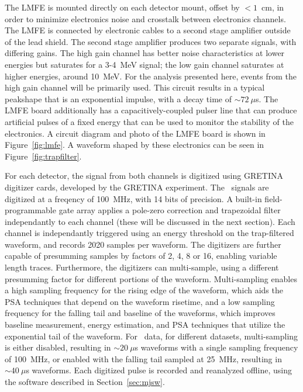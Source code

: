 \documentclass[/main.tex]{subfiles}
\begin{document}
The LMFE is mounted directly on each detector mount, offset by $<1$~cm, in order to minimize electronics noise and crosstalk between electronics channels.
The LMFE is connected by electronic cables to a second stage amplifier outside of the lead shield.
The second stage amplifier produces two separate signals, with differing gains. The high gain channel has better noise characteristics at lower energies but saturates for a 3-4~MeV signal; the low gain channel saturates at higher energies, around 10~MeV.
For the analysis presented here, events from the high gain channel will be primarily used.
This circuit results in a typical peakshape that is an exponential impulse, with a decay time of ${\sim}72~\mu$s.
The LMFE board additionally has a capacitively-coupled pulser line that can produce artificial pulses of a fixed energy that can be used to monitor the stability of the electronics.
A circuit diagram and photo of the LMFE board is shown in Figure~\ref{fig:lmfe}.
A waveform shaped by these electronics can be seen in Figure~\ref{fig:trapfilter}.

For each detector, the signal from both channels is digitized using GRETINA digitizer cards, developed by the GRETINA experiment\cite{zimmermann2012}.
The \MJD\ signals are digitized at a freqency of 100~MHz, with 14 bits of precision.
A built-in field-programmable gate array applies a pole-zero correction and trapezoidal filter independantly to each channel (these will be discussed in the next section).
Each channel is independantly triggered using an energy threshold on the trap-filtered waveform, and records 2020 samples per waveform.
The digitizers are further capable of presumming samples by factors of 2, 4, 8 or 16, enabling variable length traces.
Furthermore, the digitizers can multi-sample, using a different presumming factor for different portions of the waveform.
Multi-sampling enables a high sampling frequency for the rising edge of the waveform, which aids the PSA techniques that depend on the waveform risetime, and a low sampling frequency for the falling tail and baseline of the waveforms, which improves baseline measurement, energy estimation, and PSA techniques that utilize the exponential tail of the waveform.
For \MJD\ data, for different datasets, multi-sampling is either disabled, resulting in ${\sim}20~\mu$s waveforms with a single sampling frequency of 100~MHz, or enabled with the falling tail sampled at 25~MHz, resulting in ${\sim}40~\mu$s waveforms.
Each digitized pulse is recorded and reanalyzed offline, using the software described in Section~\ref{sec:mjsw}.
\end{document}
